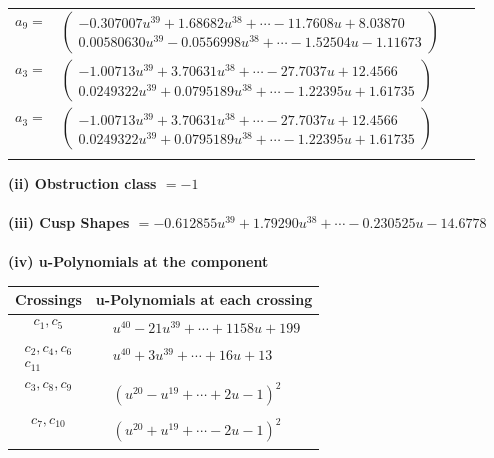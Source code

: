 \documentclass[1p]{elsarticle_modified}
\theoremstyle{definition}
\begin{document}
\begin{tabular}{m{7pt} m{180pt} m{7pt} m{180pt} }
\flushright $a_{9}=$&$\begin{pmatrix}-0.307007 u^{39}+1.68682 u^{38}+\cdots-11.7608 u+8.03870\\0.00580630 u^{39}-0.0556998 u^{38}+\cdots-1.52504 u-1.11673\end{pmatrix}$ \\
\flushright $a_{3}=$&$\begin{pmatrix}-1.00713 u^{39}+3.70631 u^{38}+\cdots-27.7037 u+12.4566\\0.0249322 u^{39}+0.0795189 u^{38}+\cdots-1.22395 u+1.61735\end{pmatrix}$\\ \flushright $a_{3}=$&$\begin{pmatrix}-1.00713 u^{39}+3.70631 u^{38}+\cdots-27.7037 u+12.4566\\0.0249322 u^{39}+0.0795189 u^{38}+\cdots-1.22395 u+1.61735\end{pmatrix}$\\&\end{tabular}
\flushleft \textbf{(ii) Obstruction class $= -1$}\\~\\
\flushleft \textbf{(iii) Cusp Shapes $= -0.612855 u^{39}+1.79290 u^{38}+\cdots-0.230525 u-14.6778$}\\~\\
\newpage\renewcommand{\arraystretch}{1}
\flushleft \textbf{(iv) u-Polynomials at the component}\newline \\
\begin{tabular}{m{50pt}|m{274pt}}
Crossings & \hspace{64pt}u-Polynomials at each crossing \\
\hline $$\begin{aligned}c_{1},c_{5}\end{aligned}$$&$\begin{aligned}
&u^{40}-21 u^{39}+\cdots+1158 u+199
\end{aligned}$\\
\hline $$\begin{aligned}c_{2},c_{4},c_{6}\\c_{11}\end{aligned}$$&$\begin{aligned}
&u^{40}+3 u^{39}+\cdots+16 u+13
\end{aligned}$\\
\hline $$\begin{aligned}c_{3},c_{8},c_{9}\end{aligned}$$&$\begin{aligned}
&(u^{20}- u^{19}+\cdots+2 u-1)^{2}
\end{aligned}$\\
\hline $$\begin{aligned}c_{7},c_{10}\end{aligned}$$&$\begin{aligned}
&(u^{20}+u^{19}+\cdots-2 u-1)^{2}
\end{aligned}$\\
\hline
\end{tabular}\\~\\
\end{document}
